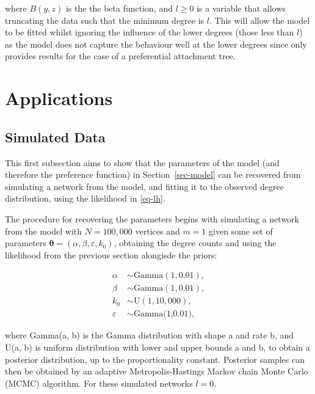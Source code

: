 \documentclass[
  sn-basic,
]{sn-jnl}
\theoremstyle{plain}
\theoremstyle{plain}
\theoremstyle{remark}
\begin{document}
where \(B(y,z)\) is the the beta function, and \(l\ge0\) is a variable
that allows truncating the data such that the minimum degree is \(l\).
This will allow the model to be fitted whilst ignoring the influence of
the lower degrees (those less than \(l\)) as the model does not capture
the behaviour well at the lower degrees since \citet{rudas07} only
provides results for the case of a preferential attachment tree.

\section{Applications}\label{applications}

\subsection{Simulated Data}\label{sec-sim}

This first subsection aims to show that the parameters of the model (and
therefore the preference function) in Section~\ref{sec-model} can be
recovered from simulating a network from the model, and fitting it to
the observed degree distribution, using the likelihood in \eqref{eq-lh}.

The procedure for recovering the parameters begins with simulating a
network from the model with \(N=100,000\) vertices and \(m=1\) given
some set of parameters
\(\pmb\theta = (\alpha, \beta, \varepsilon, k_0)\), obtaining the degree
counts and using the likelihood from the previous section alongisde the
priors:

\begin{align*}
\alpha&\sim \text{Gamma}(1,0.01),\\
\beta &\sim  \text{Gamma}(1,0.01),\\
k_0 &\sim \text{U}(1,10,000),\\
\varepsilon &\sim \text{Gamma(1,0.01)},
\end{align*}

where Gamma(a, b) is the Gamma distribution with shape a and rate b, and
U(a, b) is uniform distribution with lower and upper bounds a and b, to
obtain a posterior distribution, up to the proportionality constant.
Posterior samples can then be obtained by an adaptive
Metropolis-Hastings Markov chain Monte Carlo (MCMC) algorithm. For these
simulated networks \(l=0\).
\end{document}
